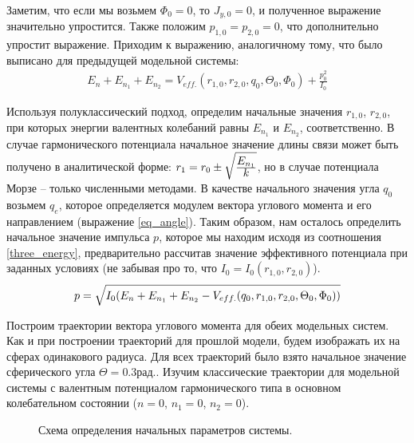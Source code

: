 Заметим, что если мы возьмем $\Phi_0 = 0$, то $J_{y, 0} = 0$, и полученное выражение значительно упростится. Также положим $p_{1,0} = p_{2,0} = 0$, что дополнительно упростит выражение.
Приходим к выражению, аналогичному тому, что было выписано для предыдущей модельной системы:
\vverh
\begin{gather}
E_n + E_{n_1} + E_{n_2} = V_{eff.}(r_{1,0}, r_{2,0}, q_0, \Theta_0, \Phi_0) + \frac{p_0^2}{I_0}
\label{three_energy}
\end{gather}

Используя полуклассический подход, определим начальные значения $r_{1, 0}$, $r_{2, 0}$, при которых энергии валентных колебаний равны $E_{n_1}$ и $E_{n_2}$, соответственно. В случае гармонического потенциала начальное значение длины связи может быть получено в аналитической форме:  $r_1 = r_0 \pm \sqrt{\frac{\displaystyle E_{n_1}}{\displaystyle k}}$, но в случае потенциала Морзе -- только численными методами. 
В качестве начального значения угла $q_0$ возьмем $q_e$, которое определяется модулем вектора углового момента и его направлением (выражение \eqref{eq_angle}). Таким образом, нам осталось определить начальное значение импульса $p$, которое мы находим исходя из соотношения \eqref{three_energy}, предварительно рассчитав значение эффективного потенциала при заданных условиях (не забывая про то, что $I_0 = I_0 (r_{1,0}, r_{2,0})$).
\vverh
\begin{gather}
p = \sqrt{I_0 (E_n + E_{n_1} + E_{n_2} - V_{eff.} (q_0, r_{1,0}, r_{2,0}, \Theta_0, \Phi_0))} \notag
\end{gather}

Построим траектории вектора углового момента для обеих модельных систем. Как и при построении траекторий для прошлой модели, будем изображать их на сферах одинакового радиуса. Для всех траекторий было взято начальное значение сферического угла $\Theta = 0.3 \text{рад.}$. Изучим классические траектории для модельной системы с валентным потенциалом гармонического типа в основном колебательном состоянии ($n = 0$, $n_1 = 0$, $n_2 = 0$).

\vverh
\begin{figure}[H]
  \begin{center}
    \caption{Схема определения начальных параметров системы.}
  \end{center}
\end{figure}

